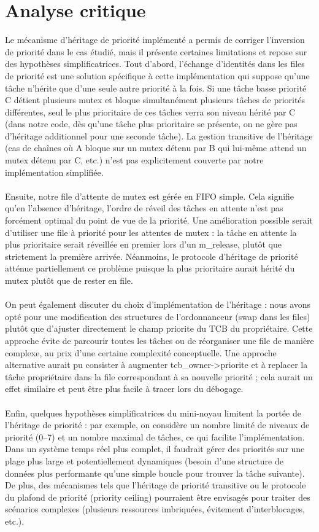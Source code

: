 \documentclass{latexPackage/utc-report/utc-report}
\begin{document}
\section{Analyse critique}
Le mécanisme d’héritage de priorité implémenté a permis de corriger l’inversion de priorité dans le cas étudié, mais il présente certaines limitations et repose sur des hypothèses simplificatrices. Tout d’abord, l’échange d’identités dans les files de priorité est une solution spécifique à cette implémentation qui suppose qu’une tâche n’hérite que d’une seule autre priorité à la fois. Si une tâche basse priorité C détient plusieurs mutex et bloque simultanément plusieurs tâches de priorités différentes, seul le plus prioritaire de ces tâches verra son niveau hérité par C (dans notre code, dès qu’une tâche plus prioritaire se présente, on ne gère pas d’héritage additionnel pour une seconde tâche). La gestion transitive de l’héritage (cas de chaînes où A bloque sur un mutex détenu par B qui lui-même attend un mutex détenu par C, etc.) n’est pas explicitement couverte par notre implémentation simplifiée.
\\\\
Ensuite, notre file d’attente de mutex est gérée en FIFO simple. Cela signifie qu’en l’absence d’héritage, l’ordre de réveil des tâches en attente n’est pas forcément optimal du point de vue de la priorité. Une amélioration possible serait d’utiliser une file à priorité pour les attentes de mutex : la tâche en attente la plus prioritaire serait réveillée en premier lors d’un m\_release, plutôt que strictement la première arrivée. Néanmoins, le protocole d’héritage de priorité atténue partiellement ce problème puisque la plus prioritaire aurait hérité du mutex plutôt que de rester en file.
\\\\
On peut également discuter du choix d’implémentation de l’héritage : nous avons opté pour une modification des structures de l’ordonnanceur (swap dans les files) plutôt que d’ajuster directement le champ priorite du TCB du propriétaire. Cette approche évite de parcourir toutes les tâches ou de réorganiser une file de manière complexe, au prix d’une certaine complexité conceptuelle. Une approche alternative aurait pu consister à augmenter tcb\_owner->priorite et à replacer la tâche propriétaire dans la file correspondant à sa nouvelle priorité ; cela aurait un effet similaire et peut être plus facile à tracer lors du débogage.
\\\\
Enfin, quelques hypothèses simplificatrices du mini-noyau limitent la portée de l’héritage de priorité : par exemple, on considère un nombre limité de niveaux de priorité (0–7) et un nombre maximal de tâches, ce qui facilite l’implémentation. Dans un système temps réel plus complet, il faudrait gérer des priorités sur une plage plus large et potentiellement dynamiques (besoin d’une structure de données plus performante qu’une simple boucle pour trouver la tâche suivante). De plus, des mécanismes tels que l’héritage de priorité transitive ou le protocole du plafond de priorité (priority ceiling) pourraient être envisagés pour traiter des scénarios complexes (plusieurs ressources imbriquées, évitement d’interblocages, etc.).
\end{document}

